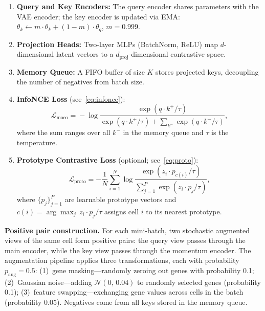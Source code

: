 \documentclass[journal]{IEEEtran}
\begin{document}
\begin{enumerate}
    \item \textbf{Query and Key Encoders:} The query encoder shares parameters with the VAE encoder; the key encoder is updated via EMA: $\theta_k \leftarrow m \cdot \theta_k + (1 - m) \cdot \theta_q$, $m = 0.999$.
    \item \textbf{Projection Heads:} Two-layer MLPs (BatchNorm, ReLU) map $d$-dimensional latent vectors to a $d_{\mathrm{proj}}$-dimensional contrastive space.
    \item \textbf{Memory Queue:} A FIFO buffer of size $K$ stores projected keys, decoupling the number of negatives from batch size.
    \item \textbf{InfoNCE Loss} (see~\eqref{eq:infonce}):
    \begin{equation}
        \mathcal{L}_{\mathrm{moco}} \!=\! -\log \frac{\exp(q \!\cdot\! k^+ / \tau)}{\exp(q \!\cdot\! k^+ / \tau) + \!\sum_{k^-} \exp(q \!\cdot\! k^- / \tau)},
        \label{eq:infonce}
    \end{equation}
    where the sum ranges over all $k^-$ in the memory queue and $\tau$ is the temperature.
    \item \textbf{Prototype Contrastive Loss} (optional; see~\eqref{eq:proto}):
    \begin{equation}
        \mathcal{L}_{\mathrm{proto}} = -\frac{1}{N} \sum_{i=1}^{N} \log \frac{\exp(z_i \cdot p_{c(i)} / \tau)}{\sum_{j=1}^{P} \exp(z_i \cdot p_j / \tau)},
        \label{eq:proto}
    \end{equation}
    where $\{p_j\}_{j=1}^{P}$ are learnable prototype vectors and $c(i) = \arg\max_j\, z_i \cdot p_j / \tau$ assigns cell $i$ to its nearest prototype.
\end{enumerate}

\textbf{Positive pair construction.} For each mini-batch, two stochastic augmented views of the same cell form positive pairs: the query view passes through the main encoder, while the key view passes through the momentum encoder. The augmentation pipeline applies three transformations, each with probability $p_{\mathrm{aug}}{=}0.5$: (1)~gene masking---randomly zeroing out genes with probability 0.1; (2)~Gaussian noise---adding $\mathcal{N}(0,\,0.04)$ to randomly selected genes (probability 0.1); (3)~feature swapping---exchanging gene values across cells in the batch (probability 0.05). Negatives come from all keys stored in the memory queue.
\end{document}
